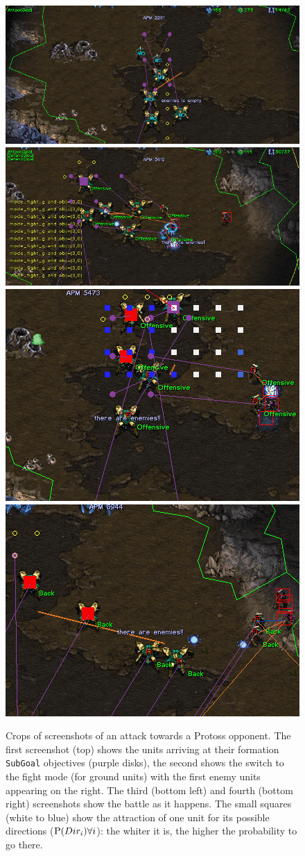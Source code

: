 \begin{figure}[h]
\begin{center}
\includegraphics[width=0.69\columnwidth]{images/botgame/attack0.png}
\vspace{0.12cm}\\
\includegraphics[width=0.69\columnwidth]{images/botgame/attack1.png}
\vspace{0.12cm}\\
\includegraphics[width=0.496\columnwidth]{images/botgame/attack2.png}
\includegraphics[width=0.496\columnwidth]{images/botgame/attack3.png}
\caption{Crops of screenshots of an attack towards a Protoss opponent. The first screenshot (top) shows the units arriving at their formation \texttt{SubGoal} objectives (purple disks), the second shows the switch to the fight mode (for ground units) with the first enemy units appearing on the right. The third (bottom left) and fourth (bottom right) screenshots show the battle as it happens. The small squares (white to blue) show the attraction of one unit for its possible directions ($\mathrm{P}(Dir_i) \forall i$): the whiter it is, the higher the probability to go there.}
\label{fig:bot_attack}
\end{center}
\end{figure}

